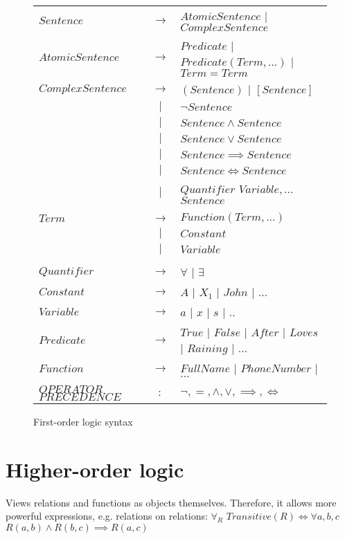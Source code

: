 \documentclass{report}
\begin{document}
\begin{figure}[h!]
\centering
\begin{tabular}{lcl}
$Sentence$ & $\rightarrow$ & $AtomicSentence$ $\vert$ $ComplexSentence$ \\
$AtomicSentence$ & $\rightarrow$ & $Predicate$ $\vert$ $Predicate(Term,...)$ $\vert$ $Term=Term$ \\
$ComplexSentence$ & $\rightarrow$ & $(Sentence)$ $\vert$ $[Sentence]$ \\
 & $\vert$ & $\neg Sentence$ \\
 & $\vert$ & $Sentence \wedge Sentence$ \\
 & $\vert$ & $Sentence \vee Sentence$ \\
 & $\vert$ & $Sentence \implies Sentence$ \\
 & $\vert$ & $Sentence \iff Sentence$ \\
 & $\vert$ & $Quantifier$ $Variable, ...$ $Sentence$ \\
\\
$Term$ & $\rightarrow$ & $Function(Term,...)$ \\
 & $\vert$ & $Constant$ \\
 & $\vert$ & $Variable$ \\
 \\
$Quantifier$ & $\rightarrow$ & $\forall$ $\vert$ $\exists$ \\
$Constant$ & $\rightarrow$ & $A$ $\vert$ $X_1$ $\vert$ $John$ $\vert$ $...$ \\
$Variable$ & $\rightarrow$ & $a$ $\vert$ $x$ $\vert$ $s$ $\vert$ $..$ \\
$Predicate$ & $\rightarrow$ & $True$ $\vert$ $False$ $\vert$ $After$ $\vert$ $Loves$ $\vert$ $Raining$ $\vert$ $...$\\
$Function$ & $\rightarrow$ & $FullName$ $\vert$ $PhoneNumber$ $\vert$ $...$ \\
\\
$OPERATOR$ $PRECEDENCE$ & $:$ & $\neg,=,\wedge,\vee,\implies,\iff$ \\
\end{tabular}
\caption{First-order logic syntax}
\label{ref:firstordersyntax}
\end{figure}



\section{Higher-order logic}
Views relations and functions as objects themselves. Therefore, it allows more powerful expressions, e.g. relations on relations: $\forall_R$ $Transitive(R)\iff \forall a,b,c$ $R(a,b)\wedge R(b,c) \implies R(a,c)$
\end{document}
